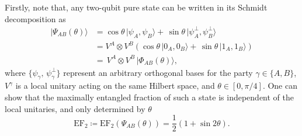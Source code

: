 \documentclass[aps,superscriptaddress,twocolumn,twoside,floatfix,pra,nofootinbib,a4paper]{revtex4-2}
\newcommand{\ket}[1]{\vert#1\rangle}
\newcommand{\ketbra}[2]{\vert #1\rangle\langle#2 \vert}
\newcommand{\armin}[1]{\textit{\small\textcolor{red}{Armin: #1}}}
\newcommand{\parnam}[1]{\textit{\small\textcolor{purple}{[PB: #1]}}}
\newtheorem{lemma}{Lemma}
\begin{document}
Firstly, note that, any two-qubit pure state can be written in its Schmidt decomposition as
\begin{align}
\ket{\Psi_{AB}(\theta)}&= \cos{\theta}\,\vert{\psi_A, \psi_B\rangle}+\, \sin{\theta}\,\vert{\psi_{A}^{\perp}, \psi_{B}^{\perp}\rangle}\nonumber\\
&= V^A \otimes V^B \left(\cos{\theta}\,\vert{0_A, 0_B\rangle}+\, \sin{\theta}\,\vert{1_{A}, 1_{B}\rangle}\right)\nonumber\\
&= \, V^A \otimes V^B \,\vert{\Phi_{AB}(\theta)\rangle},
\label{eq:Schmidt dec}
\end{align}
where $\{\psi_{\gamma},\, \psi^{\perp}_{\gamma}\}$ represent an arbitrary orthogonal bases for the party $\gamma\in\{A,B\}$, $V^{\gamma}$ is a local unitary acting on the same Hilbert space, and $\theta \in [0,\pi/4] $. 
One can show that the maximally entangled fraction of such a state is independent of the local unitaries, and only determined by $\theta$ %
\begin{equation}
\text{EF}_2\coloneqq\text{EF}_2(\Psi_{AB}(\theta))=\frac{1}{2}(1+\sin{2\theta}).
\label{eq: EF pure}
\end{equation}
   
\end{document}
